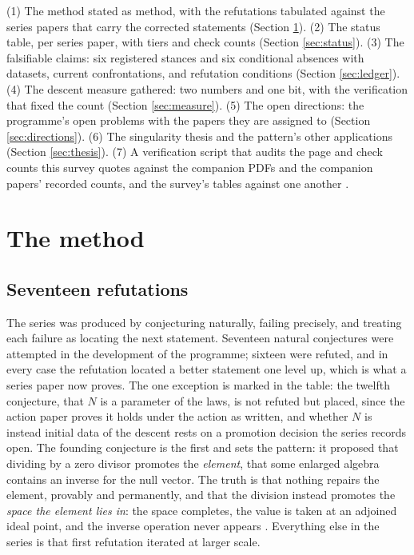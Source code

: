 \documentclass[11pt]{article}
\theoremstyle{definition}
\begin{document}
(1) The method stated as method, with the refutations tabulated against the series papers that carry the corrected statements (Section \ref{sec:method}). (2) The status table, per series paper, with tiers and check counts (Section \ref{sec:status}). (3) The falsifiable claims: six registered stances and six conditional absences with datasets, current confrontations, and refutation conditions (Section \ref{sec:ledger}). (4) The descent measure gathered: two numbers and one bit, with the verification that fixed the count (Section \ref{sec:measure}). (5) The open directions: the programme's open problems with the papers they are assigned to (Section \ref{sec:directions}). (6) The singularity thesis and the pattern's other applications (Section \ref{sec:thesis}). (7) A verification script that audits the page and check counts this survey quotes against the companion PDFs and the companion papers' recorded counts, and the survey's tables against one another \cite{ButlerVerifyT17}.

\section{The method}\label{sec:method}

\subsection{Seventeen refutations}\label{sec:refutations}

The series was produced by conjecturing naturally, failing precisely, and treating each failure as locating the next statement. Seventeen natural conjectures were attempted in the development of the programme; sixteen were refuted, and in every case the refutation located a better statement one level up, which is what a series paper now proves. The one exception is marked in the table: the twelfth conjecture, that $N$ is a parameter of the laws, is not refuted but placed, since the action paper proves it holds under the action as written, and whether $N$ is instead initial data of the descent rests on a promotion decision the series records open. The founding conjecture is the first and sets the pattern: it proposed that dividing by a zero divisor promotes the \emph{element}, that some enlarged algebra contains an inverse for the null vector. The truth is that nothing repairs the element, provably and permanently, and that the division instead promotes the \emph{space the element lies in}: the space completes, the value is taken at an adjoined ideal point, and the inverse operation never appears \cite{ButlerT1}. Everything else in the series is that first refutation iterated at larger scale.
\end{document}
